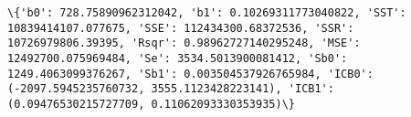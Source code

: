 \documentclass[11pt]{article}
\begin{document}
    \begin{Verbatim}[commandchars=\\\{\}]
\{'b0': 728.75890962312042, 'b1': 0.10269311773040822, 'SST': 10839414107.077675, 'SSE': 112434300.68372536, 'SSR': 10726979806.39395, 'Rsqr': 0.98962727140295248, 'MSE': 12492700.075969484, 'Se': 3534.5013900081412, 'Sb0': 1249.4063099376267, 'Sb1': 0.003504537926765984, 'ICB0': (-2097.5945235760732, 3555.1123428223141), 'ICB1': (0.09476530215727709, 0.11062093330353935)\}

    \end{Verbatim}

    \begin{center}
    \end{center}
    { \hspace*{\fill} \\}
    
\end{document}
